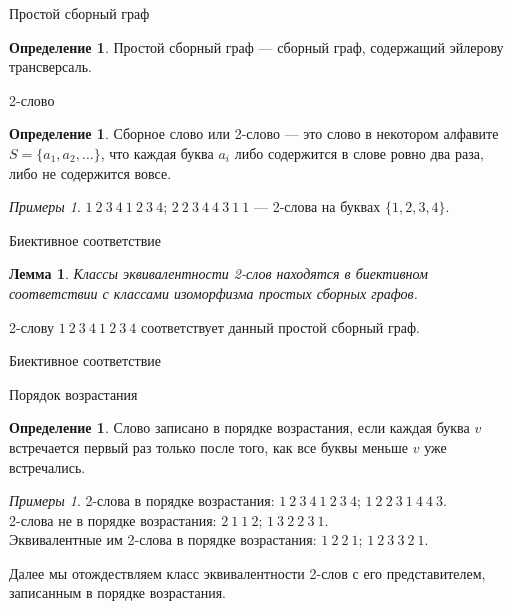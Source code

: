 \documentclass[14pt, aspectratio=169, notheorems]{beamer}
\theoremstyle{plain}
\newtheorem{lemma}[theorem]{Лемма}
\theoremstyle{definition}
\newtheorem{definition}[theorem]{Определение}
\theoremstyle{remark}
\newtheorem{examples}[theorem]{Примеры}
\begin{document}
\begin{frame}{Простой сборный граф}
    \begin{definition}
    Простой сборный граф --- сборный граф, содержащий эйлерову трансверсаль.
    \end{definition} 
    
    \centering
    
\end{frame}

\begin{frame}{2-слово}
   \begin{definition}
    Сборное слово или 2-слово --- это слово в некотором алфавите $S = \{a_1, a_2, \dots\}$, что каждая буква $a_i$ либо содержится в слове ровно два раза, либо не содержится вовсе.
    \end{definition}

    \begin{examples}
        $1\ 2\ 3\ 4\ 1\ 2\ 3\ 4$; $2\ 2\ 3\ 4\ 4\ 3\ 1\ 1$ --- 2-слова на буквах $\{1, 2, 3, 4\}$.
    \end{examples}
\end{frame}

\begin{frame}{Биективное соответствие}
    \begin{lemma}
    Классы эквивалентности 2-слов находятся в биективном соответствии с классами изоморфизма простых сборных графов.
    \end{lemma}

    2-слову $1\ 2\ 3\ 4\ 1\ 2\ 3\ 4$ соответствует данный простой сборный граф.
    
    \centering
    
\end{frame}

\begin{frame}{Биективное соответствие}
    \centering
    
    
\end{frame}

\begin{frame}{Порядок возрастания}
    \begin{definition}
    Слово записано в порядке возрастания, если каждая буква $v$ встречается первый раз только после того, как все буквы меньше $v$ уже встречались. 
    \end{definition}

    \begin{examples}
    2-слова в порядке возрастания: $1\ 2\ 3\ 4\ 1\ 2\ 3\ 4$; $1\ 2\ 2\ 3\ 1\ 4\ 4\ 3$. \\
    2-слова не в порядке возрастания: $2\ 1\ 1\ 2$; $1\ 3\ 2\ 2\ 3\ 1$. \\
    Эквивалентные им 2-слова в порядке возрастания: $1\ 2\ 2\ 1$; $1\ 2\ 3\ 3\ 2\ 1$.
    \end{examples}
    
    Далее мы отождествляем класс эквивалентности 2-слов с его представителем, записанным в порядке возрастания.
\end{frame}
\end{document}
